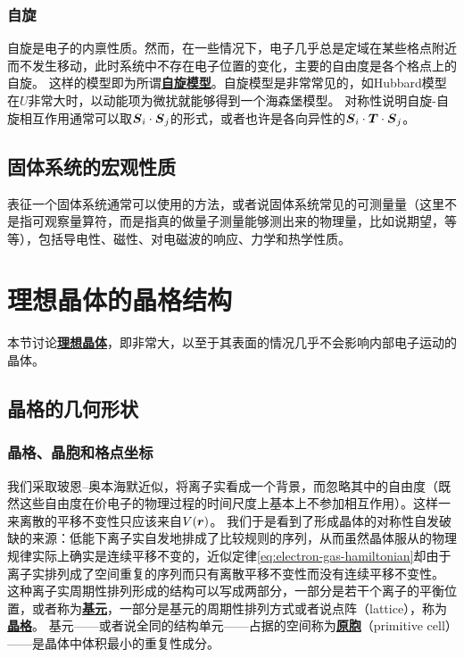 \documentclass[hyperref, UTF8, a4paper]{ctexart}
\newcommand*{\concept}[1]{\underline{\textbf{#1}}}
\begin{document}
\subsubsection{自旋}

自旋是电子的内禀性质。然而，在一些情况下，电子几乎总是定域在某些格点附近而不发生移动，此时系统中不存在电子位置的变化，主要的自由度是各个格点上的自旋。
这样的模型即为所谓\concept{自旋模型}。自旋模型是非常常见的，如Hubbard模型在$U$非常大时，以动能项为微扰就能够得到一个海森堡模型。
对称性说明自旋-自旋相互作用通常可以取$\vb*{S}_i \cdot \vb*{S}_j$的形式，或者也许是各向异性的$\vb*{S}_i \cdot \vb*{T} \cdot \vb*{S}_j$。

\subsection{固体系统的宏观性质}

表征一个固体系统通常可以使用的方法，或者说固体系统常见的可测量量（这里不是指可观察量算符，而是指真的做量子测量能够测出来的物理量，比如说期望，等等），包括导电性、磁性、对电磁波的响应、力学和热学性质。

\section{理想晶体的晶格结构}\label{sec:lattice-structure}

本节讨论\concept{理想晶体}，即非常大，以至于其表面的情况几乎不会影响内部电子运动的晶体。

\subsection{晶格的几何形状}

\subsubsection{晶格、晶胞和格点坐标}

我们采取玻恩–奥本海默近似，将离子实看成一个背景，而忽略其中的自由度（既然这些自由度在价电子的物理过程的时间尺度上基本上不参加相互作用）。这样一来离散的平移不变性只应该来自$V(\vb*{r})$。
我们于是看到了形成晶体的对称性自发破缺的来源：低能下离子实自发地排成了比较规则的序列，从而虽然晶体服从的物理规律实际上确实是连续平移不变的，近似定律\eqref{eq:electron-gas-hamiltonian}却由于离子实排列成了空间重复的序列而只有离散平移不变性而没有连续平移不变性。
这种离子实周期性排列形成的结构可以写成两部分，一部分是若干个离子的平衡位置，或者称为\concept{基元}，一部分是基元的周期性排列方式或者说点阵（lattice），称为\concept{晶格}。
基元——或者说全同的结构单元——占据的空间称为\concept{原胞}（primitive cell）——是晶体中体积最小的重复性成分。
\end{document}
